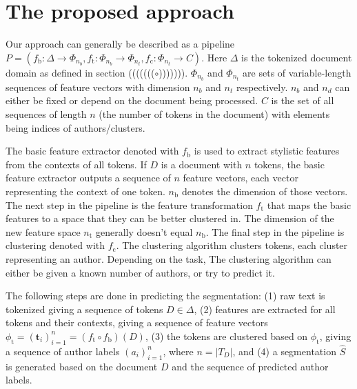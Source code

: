 \documentclass[10pt, a4paper]{article}
\begin{document}
\section{The proposed approach}

Our approach can generally be described as a pipeline $P = (f_\mathrm{b}:\Delta\rightarrow \Phi_{n_b}, f_\mathrm{t}:\Phi_{n_b}\rightarrow \Phi_{n_t}, f_\mathrm{c}:\Phi_{n_t}\rightarrow C)$. Here $\Delta$ is the tokenized document domain as defined in section ((((((($\circ$))))))). $\Phi_{n_b}$ and $\Phi_{n_t}$ are sets of variable-length sequences of feature vectors with dimension $n_b$ and $n_t$ respectively. $n_b$ and $n_d$ can either be fixed or depend on the document being processed. $C$ is the set of all sequences of length $n$ (the number of tokens in the document) with elements being indices of authors/clusters.

The basic feature extractor denoted with $f_\mathrm{b}$ is used to extract stylistic features from the contexts of all tokens. If $D$ is a document with $n$ tokens, the basic feature extractor outputs a sequence of $n$ feature vectors, each vector representing the context of one token. $n_\mathrm{b}$ denotes the dimension of those vectors. The next step in the pipeline is the feature transformation $f_\mathrm{t}$ that maps the basic features to a space that they can be better clustered in. The dimension of the new feature space $n_\mathrm{t}$ generally doesn't equal $n_\mathrm{b}$. The final step in the pipeline is clustering denoted with $f_\mathrm{c}$. The clustering algorithm clusters tokens, each cluster representing an author. Depending on the task, The clustering algorithm can either be given a known number of authors, or try to predict it.

The following steps are done in predicting the segmentation: (1) raw text is tokenized giving a sequence of tokens $D\in\Delta$, (2) features are extracted for all tokens and their contexts, giving a sequence of feature vectors $\phi_\mathrm{t} = (\mathbf{t}_i)_{i=1}^n = (f_\mathrm{t}\circ f_\mathrm{b})(D)$, (3) the tokens are clustered based on $\phi_\mathrm{t}$, giving a sequence of author labels $(a_i)_{i=1}^{n}$, where $n=|T_D|$, and (4) a segmentation $\hat{S}$ is generated based on the document $D$ and the sequence of predicted author labels.
\end{document}
